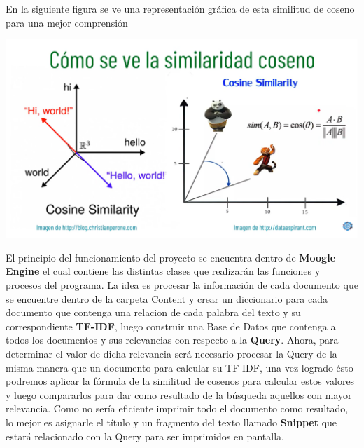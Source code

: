 \documentclass[12pt, Letterpaper]{article}
\begin{document}
\begin{itemize}
\begin{itemize}
            En la siguiente figura se ve una representación gráfica de esta similitud de coseno para una mejor comprensión
            \begin{center}
            \includegraphics[width=11cm $$  $$]{Sim Cos.png}
            \end{center}
        \end{itemize}
    \end{itemize}
    \newpage
    El principio del funcionamiento del proyecto se encuentra dentro de \textbf{Moogle Engine} el cual contiene las 
    distintas clases que realizarán las funciones y procesos del programa. La idea es procesar la información de cada
    documento que se encuentre dentro de la carpeta Content y crear un diccionario para cada documento que contenga
    una relacion de cada palabra del texto y su correspondiente \textbf{TF-IDF}, luego construir una Base de Datos 
    que contenga a todos los documentos y sus relevancias con respecto a la \textbf{Query}. Ahora, para determinar el
    valor de dicha relevancia será necesario procesar la Query de la misma manera que un documento para calcular su
    TF-IDF, una vez logrado ésto podremos aplicar la fórmula de la similitud de cosenos para calcular estos valores y
    luego compararlos para dar como resultado de la búsqueda aquellos con mayor relevancia. Como no sería eficiente 
    imprimir todo el documento como resultado, lo mejor es asignarle el título y un fragmento del texto llamado 
    \textbf{Snippet} que estará relacionado con la Query para ser imprimidos en pantalla.
    
\end{document}
